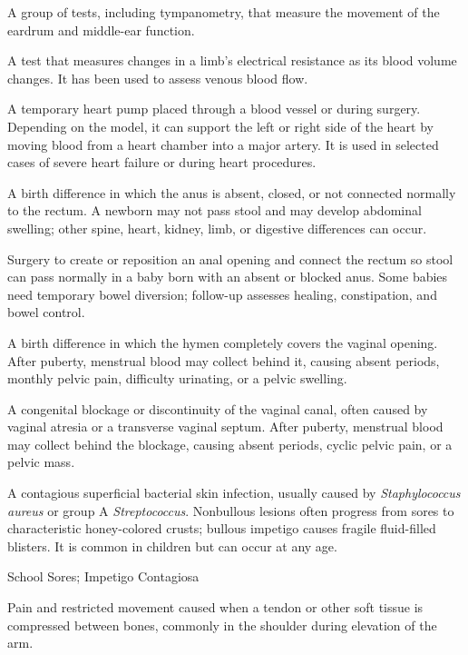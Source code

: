  A group of tests, including tympanometry, that measure the movement of the eardrum and middle-ear function.

 A test that measures changes in a limb’s electrical resistance as its blood volume changes. It has been used to assess venous blood flow.

 A temporary heart pump placed through a blood vessel or during surgery. Depending on the model, it can support the left or right side of the heart by moving blood from a heart chamber into a major artery. It is used in selected cases of severe heart failure or during heart procedures.

 A birth difference in which the anus is absent, closed, or not connected normally to the rectum. A newborn may not pass stool and may develop abdominal swelling; other spine, heart, kidney, limb, or digestive differences can occur.

 Surgery to create or reposition an anal opening and connect the rectum so stool can pass normally in a baby born with an absent or blocked anus. Some babies need temporary bowel diversion; follow-up assesses healing, constipation, and bowel control.

 A birth difference in which the hymen completely covers the vaginal opening. After puberty, menstrual blood may collect behind it, causing absent periods, monthly pelvic pain, difficulty urinating, or a pelvic swelling.

 A congenital blockage or discontinuity of the vaginal canal, often caused by vaginal atresia or a transverse vaginal septum. After puberty, menstrual blood may collect behind the blockage, causing absent periods, cyclic pelvic pain, or a pelvic mass.

 A contagious superficial bacterial skin infection, usually caused by \textit{Staphylococcus aureus} or group A \textit{Streptococcus}. Nonbullous lesions often progress from sores to characteristic honey-colored crusts; bullous impetigo causes fragile fluid-filled blisters. It is common in children but can occur at any age.

\synonyms
School Sores; Impetigo Contagiosa

 Pain and restricted movement caused when a tendon or other soft tissue is compressed between bones, commonly in the shoulder during elevation of the arm.


